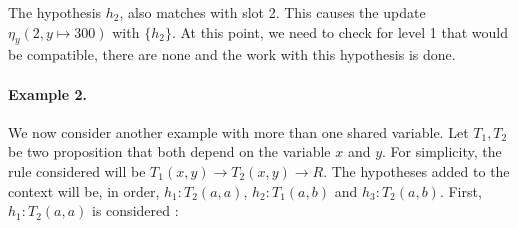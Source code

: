 \documentclass[runningheads]{llncs}
\begin{document}
The hypothesis $h_2$, also matches with slot 2.
This causes the update $\eta_y(2, y \mapsto 300)$ with $\{h_2\}$. 
At this point, we need to check for level 1 that would be compatible, there are none and the work with this hypothesis is done.

\begin{center}
    \end{center}

\paragraph{Example 2.}
We now consider another example with more than one shared variable.
Let $T_1, T_2$ be two proposition that both depend on the variable $x$ and $y$.
For simplicity, the rule considered will be $T_1(x,y) \to T_2(x,y) \to R$.
The hypotheses added to the context will be, in order, $h_1 : T_2(a,a)$, $h_2 : T_1(a,b)$ and $h_3 : T_2(a,b)$.
First, $h_1 : T_2(a,a)$ is considered :
\end{document}
